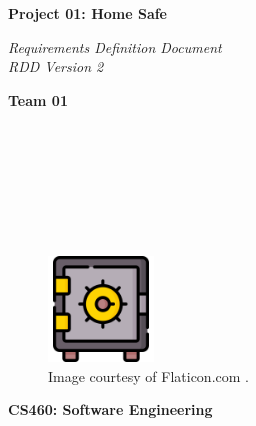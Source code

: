 \documentclass{article}
\begin{document}
\begin{titlepage}
\begin{center}
\vspace*{1cm}

\Huge
\textbf{Project 01: Home Safe}

\vspace{0.5cm}
\Large
\textit{Requirements Definition Document} \\
\textit{RDD Version 2}

\vspace{1cm}

\textbf{Team 01}

\vspace{0.5cm}

 \\
 \\
 \\
 \\
 \\
 \\

\vspace{1cm}

\begin{figure}[h]
    \centering
    \includegraphics[width=0.25\textwidth]{docs/figs/safe.png}
    \caption*{Image courtesy of Flaticon.com \cite{flaticonSafeDeposit}.}
    \label{fig:safeIcon}
\end{figure}


\vspace{2.5cm}

\Large
\textbf{CS460: Software Engineering} \\

\end{center}
\end{titlepage}

\newpage

\tableofcontents

\newpage
\end{document}
